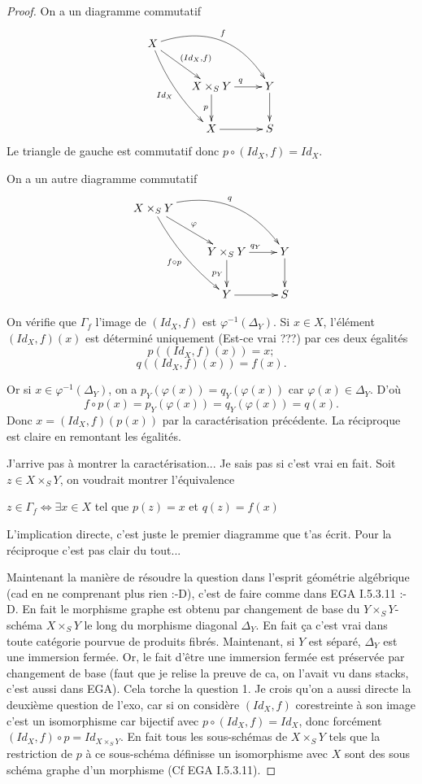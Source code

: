 \documentclass[A4, 11pt]{article}
\begin{document}
 \begin{proof}
 On a un diagramme commutatif
$$\xymatrix{
X \ar@/_/[ddr]_{Id_X} \ar[rd]^{(Id_X,f)} \ar@/^2pc/[rrd]^{f}  & & \\
& X\times_S Y \ar[r]^{q} \ar[d]_{p} & Y\ar[d] \\
& X\ar[r] & S \\
}$$
Le triangle de gauche est commutatif donc $p\circ (Id_X,f)=Id_X$.


On a un autre diagramme commutatif
$$\xymatrix{
X\times_S Y \ar@/_/[ddr]_{f\circ p} \ar[rd]^{\varphi} \ar@/^2pc/[rrd]^{q}  & & \\
& Y\times_S Y \ar[r]^{q_Y} \ar[d]_{p_Y} & Y\ar[d] \\
& Y\ar[r] & S \\
}$$

On vérifie que $\Gamma_f$ l'image de $(Id_X,f)$ est $\varphi^{-1}(\Delta_Y)$. 
Si $x\in X$, l'élément $(Id_X,f)(x)$ est déterminé uniquement (Est-ce vrai ???) par ces deux égalités 
$$p( (Id_X,f)(x))= x;$$
$$q ( (Id_X,f)(x))=f(x).$$

Or si $x\in \varphi^{-1}(\Delta_Y)$, on a $p_Y(\varphi(x))=q_Y(\varphi(x))$ car $\varphi(x)\in \Delta_Y$. D'où
$$f\circ p (x)=p_Y (\varphi (x))=q_Y(\varphi(x))=q(x).$$
Donc $x=(Id_X,f)(p(x))$ par la caractérisation précédente. La réciproque est claire en remontant les égalités. 

{\color{blue} J'arrive pas à montrer la caractérisation... Je sais pas si c'est vrai en fait. Soit $z\in X\times_S Y$, on voudrait montrer l'équivalence
\begin{center}
$z\in \Gamma_f \iff \exists x \in X$ tel que $p(z)=x$ et $q(z)=f(x)$
\end{center} 
L'implication directe, c'est juste le premier diagramme que t'as écrit. Pour la réciproque
c'est pas clair du tout...

Maintenant la manière de résoudre la question dans l'esprit géométrie algébrique (cad en ne comprenant plus rien :-D), c'est de faire comme dans EGA I.5.3.11 :-D. En fait le morphisme graphe est obtenu par changement de base du $Y\times_S Y$-schéma $X\times_S Y$ le long du morphisme diagonal $\Delta_Y$. En fait ça c'est vrai dans toute catégorie pourvue de produits fibrés. Maintenant, si $Y$ est séparé, $\Delta_Y$ est une immersion fermée. Or, le fait d'être une immersion fermée est préservée par changement de base (faut que je relise la preuve de ca, on l'avait vu dans stacks, c'est aussi dans EGA). Cela torche la question 1. Je crois qu'on a aussi directe la deuxième question de l'exo, car si on considère $(Id_X,f)$ corestreinte à son image c'est un isomorphisme car bijectif avec $p\circ (Id_X,f)= Id_X$, donc forcément $(Id_X,f)\circ p=Id_{X\times_S Y}$. En fait tous les sous-schémas de $X\times_S Y$ tels que la restriction de $p$ à ce sous-schéma définisse un isomorphisme avec $X$ sont des sous schéma graphe d'un morphisme (Cf EGA I.5.3.11).}

 \end{proof}
\end{document}
